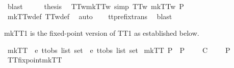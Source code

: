 \begin{isabellebody}
\ blast\isanewline
\ \ \isamarkupfalse%
\ \isamarkupfalse%
\ {\isacharquery}thesis\ \isacommand{{\isachardot}}\isamarkupfalse%
\isanewline
{}\isamarkupfalse%
%
\endisatagproof
{\isafoldproof}%
%
\isadelimproof
\isanewline
%
\endisadelimproof
\isanewline
{}\isamarkupfalse%
\ TT{}w{\isacharunderscore}mkTT{}w\ {\isacharbrackleft}simp{\isacharbrackright}{\isacharcolon}\ {\isachardoublequoteopen}TT{}w\ {\isacharparenleft}mkTT{}w\ P{\isacharparenright}{\isachardoublequoteclose}\isanewline
%
\isadelimproof
\ \ %
\endisadelimproof
%
\isatagproof
{}\isamarkupfalse%
\ mkTT{}w{\isacharunderscore}def\ TT{}w{\isacharunderscore}def\ \isamarkupfalse%
\ auto\isanewline
\ \ \isamarkupfalse%
\ tt{\isacharunderscore}prefix{\isacharunderscore}trans\ \isamarkupfalse%
\ blast%
\endisatagproof
{\isafoldproof}%
%
\isadelimproof
%
\endisadelimproof
%
%
\begin{isamarkuptext}%
mkTT1 is the fixed-point version of TT1 as established below.%
\end{isamarkuptext}\isamarkuptrue%
\isamarkupfalse%
\ mkTT{}\ {\isacharcolon}{\isacharcolon}\ {\isachardoublequoteopen}{\isacharprime}e\ ttobs\ list\ set\ {\isasymRightarrow}\ {\isacharprime}e\ ttobs\ list\ set{\isachardoublequoteclose}\ \isanewline
{\isachardoublequoteopen}mkTT{}\ P\ {\isacharequal}\ P\ {\isasymunion}\ {\isacharbraceleft}{\isasymrho}{\isacharbar}{\isasymrho}\ {\isasymsigma}{\isachardot}\ {\isasymrho}\ {\isasymlesssim}\isactrlsub C\ {\isasymsigma}\ {\isasymand}\ {\isasymsigma}\ {\isasymin}\ P{\isacharbraceright}{\isachardoublequoteclose}\isanewline
\isanewline
{}\isamarkupfalse%
\ TT{}{\isacharunderscore}fixpoint{\isacharunderscore}mkTT{}{\isacharcolon}\isanewline

\end{isabellebody}
